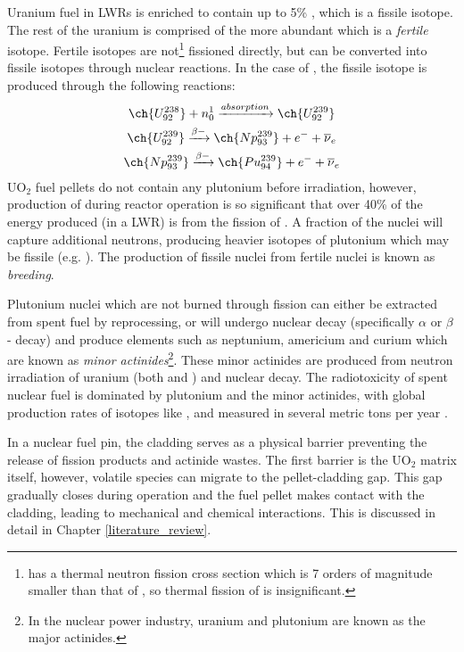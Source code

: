 Uranium fuel in LWRs is enriched to contain up to 5\% , which is a fissile isotope. The rest of the uranium is comprised of the more abundant  which is a \emph{fertile} isotope. Fertile isotopes are not\footnote{ has a thermal neutron fission cross section which is 7 orders of magnitude smaller than that of , so thermal fission of  is insignificant.} fissioned directly, but can be converted into fissile isotopes through nuclear reactions. In the case of , the fissile isotope  is produced through the following reactions:
\begin{gather}
\ch{U^{238}_{92}} + n^{1}_{0} \xrightarrow[]{absorption} \ch{U^{239}_{92}} \\
\ch{U^{239}_{92}} \xrightarrow[]{\beta-} \ch{Np^{239}_{93}} + e^{-} + \overline{\nu}_{e} \\
\ch{Np^{239}_{93}} \xrightarrow[]{\beta-} \ch{Pu^{239}_{94}} + e^{-} + \overline{\nu}_{e}
\end{gather}
UO$_{2}$ fuel pellets do not contain any plutonium before irradiation, however, production of  during reactor operation is so significant that over 40\% of the energy produced (in a LWR) is from the fission of . A fraction of the  nuclei will capture additional neutrons, producing heavier isotopes of plutonium which may be fissile (e.g. ). The production of fissile nuclei from fertile nuclei is known as \emph{breeding}.

Plutonium nuclei which are not burned through fission can either be extracted from spent fuel by reprocessing, or will undergo nuclear decay (specifically $\alpha$ or $\beta$- decay) and produce elements such as neptunium, americium and curium which are known as \emph{minor actinides}\footnote{In the nuclear power industry, uranium and plutonium are known as the major actinides.}. These minor actinides are produced from neutron irradiation of uranium (both  and ) and nuclear decay. The radiotoxicity of spent nuclear fuel is dominated by plutonium and the minor actinides, with global production rates of isotopes like ,  and  measured in several metric tons per year \cite{Ewing2004}. 

In a nuclear fuel pin, the cladding serves as a physical barrier preventing the release of fission products and actinide wastes. The first barrier is the UO$_{2}$ matrix itself, however, volatile species can migrate to the pellet-cladding gap. This gap gradually closes during operation and the fuel pellet makes contact with the cladding, leading to mechanical and chemical interactions. This is discussed in detail in Chapter \ref{literature_review}.